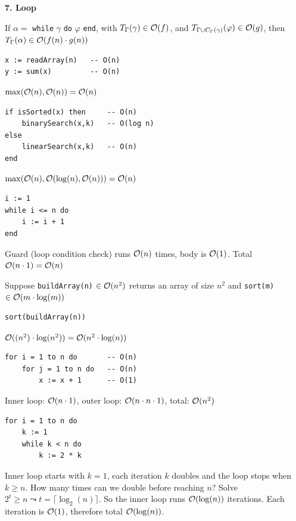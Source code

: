 \textbf{7. Loop}

If $\alpha = $ \texttt{while} $\gamma$ \texttt{do} $\varphi$ \texttt{end}, with $T_{\Gamma}(\gamma) \in \mathcal{O}(f)$, and $T_{\Gamma \cup C_{\Gamma}(\gamma)}(\varphi) \in \mathcal{O}(g)$, then $T_{\Gamma} (\alpha) \in \mathcal{O}(f(n) \cdot g(n))$


\begin{verbatim}
x := readArray(n)   -- O(n)
y := sum(x)         -- O(n)
\end{verbatim}
$\operatorname{max}(\mathcal{O}(n),\mathcal{O}(n)) = \mathcal{O}(n)$

\begin{verbatim}
if isSorted(x) then     -- O(n)
    binarySearch(x,k)   -- O(log n)
else
    linearSearch(x,k)   -- O(n)
end
\end{verbatim}
$\operatorname{max}(\mathcal{O}(n), \mathcal{O}(\operatorname{log} (n), \mathcal{O}(n))) = \mathcal{O}(n)$

\begin{verbatim}
i := 1
while i <= n do 
    i := i + 1
end
\end{verbatim}
Guard (loop condition check) runs $\mathcal{O}(n)$ times, body is $\mathcal{O}(1)$. Total $\mathcal{O}(n \cdot 1) = \mathcal{O}(n)$

Suppose \texttt{buildArray(n)} $\in \mathcal{O}(n^2)$ returns an array  of size $n^2$ and \texttt{sort(m)} $\in \mathcal{O}(m \cdot \operatorname{log}(m))$
\begin{verbatim}
sort(buildArray(n))
\end{verbatim}
$\mathcal{O}((n^2) \cdot \operatorname{log} (n^2)) = \mathcal{O}(n^2 \cdot \operatorname{log} (n))$

\begin{verbatim}
for i = 1 to n do       -- O(n)
    for j = 1 to n do   -- O(n)
        x := x + 1      -- O(1)
\end{verbatim}
Inner loop: $\mathcal{O}(n \cdot 1)$, outer loop: $\mathcal{O}(n \cdot n \cdot 1)$, total: $\mathcal{O}(n^2)$

\begin{verbatim}
for i = 1 to n do
    k := 1
    while k < n do
        k := 2 * k
\end{verbatim}
Inner loop starts with $k=1$, each iteration $k$ doubles and the loop stops when $k \geq n$. How many times can we double before reaching $n$? Solve $2^t \geq n \leadsto t = \lceil \operatorname{log}_2 (n) \rceil$. So the inner loop runs $\mathcal{O}(\operatorname{log}(n))$ iterations. Each iteration is $\mathcal{O}(1)$, therefore total $\mathcal{O}(\operatorname{log}(n))$.

